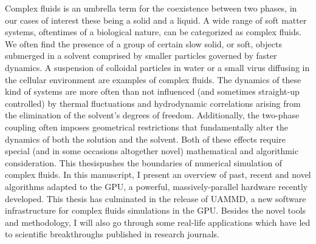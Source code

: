 \documentclass[ twoside,openright,titlepage,numbers=noenddot,%
headinclude,footinclude,cleardoublepage=empty,abstract=on,
BCOR=5mm,paper=b5,fontsize=11pt, dvipsnames
]{scrreprt}
\begin{document}
Complex fluids is an umbrella term for the coexistence between two phases, in our cases of interest these being a solid and a liquid. A wide range of soft matter systems, oftentimes of a biological nature, can be categorized as complex fluids. We often find the presence of a group of certain slow solid, or soft, objects submerged in a solvent comprised by smaller particles governed by faster dynamics. A suspension of colloidal particles in water or a small virus diffusing in the cellular environment are examples of complex fluids. The dynamics of these kind of systems are more often than not influenced (and sometimes straight-up controlled) by thermal fluctuations and hydrodynamic correlations arising from the elimination of the solvent's degrees of freedom. Additionally, the two-phase coupling often imposes geometrical restrictions that fundamentally alter the dynamics of both the solution and the solvent. Both of these effects require special (and in some occasions altogether novel) mathematical and algorithmic consideration. This thesispushes the boundaries of numerical simulation of complex fluids. In this manuscript, I present an overview of past, recent and novel algorithms adapted to the GPU, a powerful, massively-parallel hardware recently developed. This thesis has culminated in the release of UAMMD, a new software infrastructure for complex fluids simulations in the GPU. Besides the novel tools and methodology, I will also go through some real-life applications which have led to scientific breakthroughs published in research journals.

\cleardoublepage
\newpage
\end{document}
